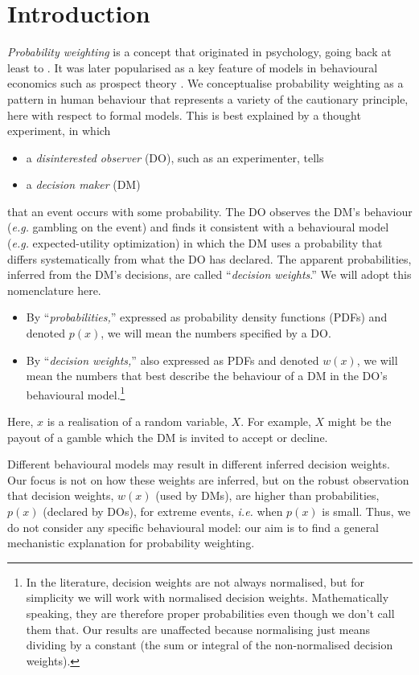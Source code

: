 \documentclass[a4paper, 12pt]{article}
\newcommand{\bi}{\begin{itemize}}
\newcommand{\ei}{\end{itemize}}
\newcommand{\ie}{\textit{i.e.}\xspace}
\newcommand{\eg}{\textit{e.g.}\xspace}
\begin{document}
\section{Introduction}
\textit{Probability weighting} is a concept that originated in psychology, going back at least to \textcite{PrestonBaratta1948}.
It was later popularised as a key feature of models in behavioural economics such as prospect theory \parencite{KahnemanTversky1979,TverskyKahneman1992}.
We conceptualise probability weighting as a pattern in human behaviour that represents a variety of the cautionary principle, here with respect to formal models.
This is best explained by a thought experiment, in which  
\bi
	\item a \textit{disinterested observer} (DO), such as an experimenter, tells
	\item a \textit{decision maker} (DM)
\ei
that an event occurs with some probability. The DO observes the DM's behaviour (\eg gambling on the event) and finds it consistent with a behavioural model (\eg expected-utility optimization) in which the DM uses a probability that differs systematically from what the DO has declared. The apparent probabilities, inferred from the DM's decisions, are called ``\textit{decision weights}.'' We will adopt this nomenclature here.
% 
\bi
	\item By ``\textit{probabilities,}'' expressed as probability density functions (PDFs) and denoted $p(x)$, we will mean the numbers specified by a DO.
	\item By ``\textit{decision weights,}'' also expressed as PDFs and denoted $w(x)$, we will mean the numbers that best describe the behaviour of a DM in the DO's behavioural model.\footnote{In the literature, decision weights are not always normalised, but for simplicity we will work with normalised decision weights. Mathematically speaking, they are therefore proper probabilities even though we don't call them that. Our results are unaffected because normalising just means dividing by a constant (the sum or integral of the non-normalised decision weights).}
\ei
Here, $x$ is a realisation of a random variable, $X$. For example, $X$ might be the payout of a gamble which the DM is invited to accept or decline.

Different behavioural models may result in different inferred decision weights. Our focus is not on how these weights are inferred, but on the robust observation that decision weights, $w(x)$ (used by DMs), are higher than probabilities, $p(x)$ (declared by DOs), for extreme events, \ie when $p(x)$ is small. Thus, we do not consider any specific behavioural model: our aim is to find a general mechanistic explanation for probability weighting.
\end{document}
